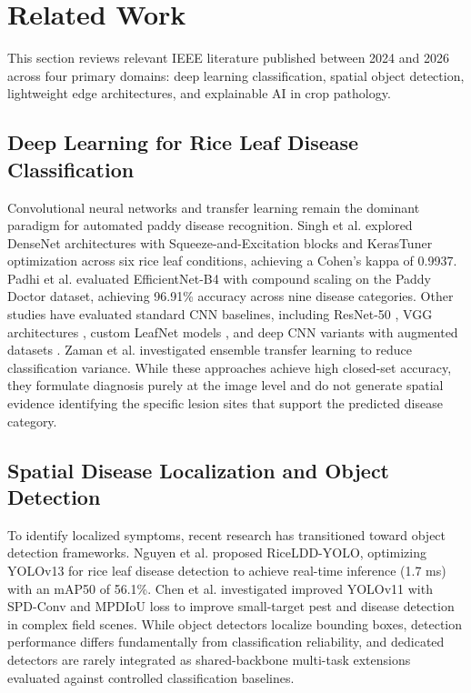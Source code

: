 \section{Related Work}
\label{sec:related_work}

This section reviews relevant IEEE literature published between 2024 and 2026 across four primary domains: deep learning classification, spatial object detection, lightweight edge architectures, and explainable AI in crop pathology.

\subsection{Deep Learning for Rice Leaf Disease Classification}
Convolutional neural networks and transfer learning remain the dominant paradigm for automated paddy disease recognition. Singh et al. \cite{ref2} explored DenseNet architectures with Squeeze-and-Excitation blocks and KerasTuner optimization across six rice leaf conditions, achieving a Cohen's kappa of 0.9937. Padhi et al. \cite{ref15} evaluated EfficientNet-B4 with compound scaling on the Paddy Doctor dataset, achieving 96.91\% accuracy across nine disease categories. Other studies have evaluated standard CNN baselines, including ResNet-50 \cite{ref19}, VGG architectures \cite{ref13}, custom LeafNet models \cite{ref17}, and deep CNN variants with augmented datasets \cite{ref10, ref16}. Zaman et al. \cite{ref11} investigated ensemble transfer learning to reduce classification variance. While these approaches achieve high closed-set accuracy, they formulate diagnosis purely at the image level and do not generate spatial evidence identifying the specific lesion sites that support the predicted disease category.

\subsection{Spatial Disease Localization and Object Detection}
To identify localized symptoms, recent research has transitioned toward object detection frameworks. Nguyen et al. \cite{ref1} proposed RiceLDD-YOLO, optimizing YOLOv13 for rice leaf disease detection to achieve real-time inference (1.7 ms) with an mAP50 of 56.1\%. Chen et al. \cite{ref12} investigated improved YOLOv11 with SPD-Conv and MPDIoU loss to improve small-target pest and disease detection in complex field scenes. While object detectors localize bounding boxes, detection performance differs fundamentally from classification reliability, and dedicated detectors are rarely integrated as shared-backbone multi-task extensions evaluated against controlled classification baselines.

